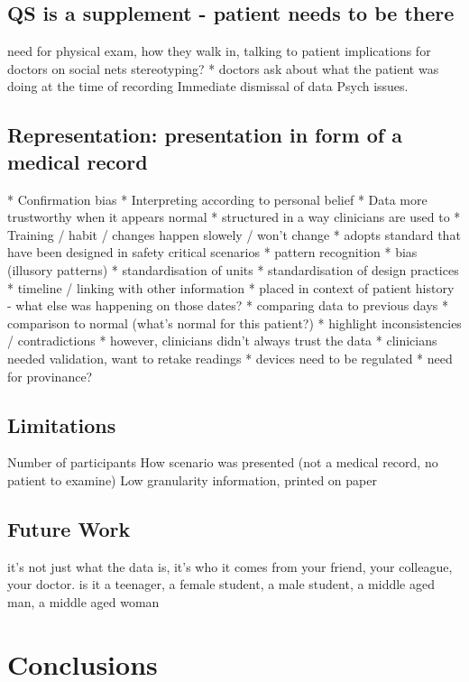 \documentclass{sigchi}
\begin{document}
\subsection{QS is a supplement - patient needs to be there}
need for physical exam, how they walk in, talking to patient
implications for doctors on social nets
stereotyping?
* doctors ask about what the patient was doing at the time of recording
Immediate dismissal of data
Psych issues.

\subsection{Representation: presentation in form of a medical record} %
* Confirmation bias
* Interpreting according to personal belief
* Data more trustworthy when it appears normal
* structured in a way clinicians are used to
  * Training / habit / changes happen slowely / won't change
  * adopts standard that have been designed in safety critical scenarios
    * pattern recognition
    * bias (illusory patterns)
    * standardisation of units
    * standardisation of design practices
* timeline / linking with other information
  * placed in context of patient history - what else was happening on those dates?
  * comparing data to previous days
  * comparison to normal (what's normal for this patient?)
  * highlight inconsistencies / contradictions
* however, clinicians didn't always trust the data
  * clinicians needed validation, want to retake readings
  * devices need to be regulated
  * need for provinance?

\subsection{Limitations}

Number of participants
How scenario was presented (not a medical record, no patient to examine)
Low granularity information, printed on paper

\subsection{Future Work}

it's not just what the data is, it's who it comes from {your friend, your colleague, your doctor}. is it {a teenager, a female student, a male student, a middle aged man, a middle aged woman}


\section{Conclusions}




\end{document}
